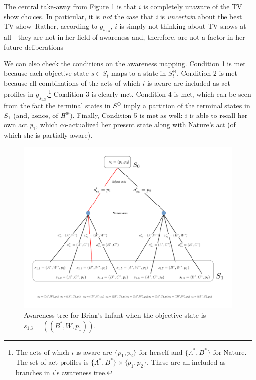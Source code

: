 \documentclass[
11pt,
titlepage,
reqno,
]{article}%
\theoremstyle{definition}
\begin{document}
The central take-away from Figure \ref{Diag: p-02} is that $i$ is completely unaware of the TV show choices.
In particular, it is \textit{not} the case that $i$ is \textit{uncertain} about the best TV show.
Rather, according to $g_{s_{1.3}}$, $i$ is simply not thinking about TV shows at all---they are not in her field of awareness and, therefore, are not a factor in her future deliberations.

We can also check the conditions on the awareness mapping. 
Condition 1 is met because each objective state $s\in S_t$ maps to a state in $S^\ominus_t$.
Condition 2 is met because all combinations of the acts of which $i$ is aware are included as act profiles in $g_{s_{1.3}}$.\footnote
{
	The acts of which $i$ is aware are $\{p_1,p_2\}$ for herself and $\{A^\ast,B^\ast\}$ for Nature. The set of act profiles is  $\{A^\ast,B^\ast\}\times \{p_1,p_2\}$. These are all included as branches in $i$'s awareness tree. 
}
Condition 3 is clearly met. 
Condition 4 is met, which can be seen from the fact the terminal states in $S^\ominus$ imply a partition of the terminal states in $S_1$ (and, hence, of $H^\oplus$).
Finally, Condition 5 is met as well: $i$ is able to recall her own act $p_1$, which co-actualized her present state along with Nature's act (of which she is partially aware).

\begin{figure}[h!]
	\centering
	\includegraphics*[page=2,trim = 0in 0in 0in 0in,scale=.6]{Awareness_Diagrams_All}
	\caption{Awareness tree for Brian's Infant when the objective state is $s_{1.3}=((B^\ast,W,p_1)) $.\label{Diag: p-02}}%
\end{figure}
	
\end{document}
